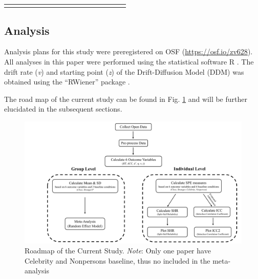 \documentclass[sn-apa]{sn-jnl}%
\theoremstyle{thmstyleone}%
\theoremstyle{thmstyletwo}%
\theoremstyle{thmstylethree}%
\begin{document}
\begin{table}
\begin{tabular*}{\textwidth}{@{\extracolsep\fill}lp{0.5cm}p{1cm}p{1cm}p{1cm}cp{1cm}cccccccccc}
		\botrule
	\end{tabular*}
\end{table}
\clearpage

\subsection{Analysis }\label{subsec:analysis}

Analysis plans for this study were preregistered on OSF (\url{https://osf.io/zv628}). All analyses in this paper were performed using the statistical software R \parencite{Rcore2021}. The drift rate (\textit{v}) and starting point (\textit{z}) of the Drift-Diffusion Model (DDM) was obtained using the ``RWiener” package \parencite{wabersich2014rwiener}.

The road map of the current study can be found in Fig. \ref{fig:roadmap} and will be further elucidated in the subsequent sections. 

\begin{figure}[!htbp]
	\centering
	\includegraphics[width=1\textwidth]{./Figure/Fig_2_flow_chart.pdf}
	\caption{Roadmap of the Current Study. \textit{Note}: Only one paper have Celebrity and Nonpersons baseline, thus no included in the meta-analysis
	}
	\label{fig:roadmap}
\end{figure}
\end{document}
